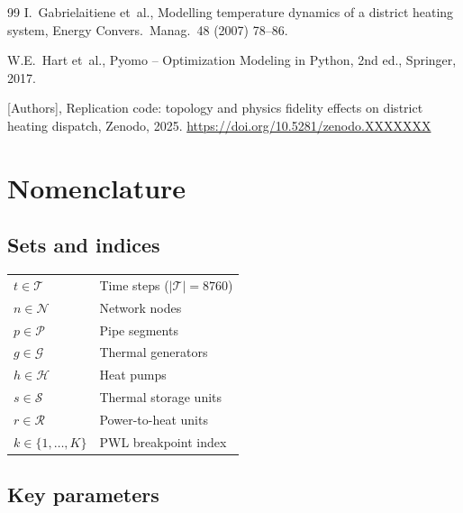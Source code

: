 \documentclass[review,3p]{elsarticle}
\begin{document}
\begin{thebibliography}{99}
I.~Gabrielaitiene et~al.,
Modelling temperature dynamics of a district heating system,
Energy Convers.\ Manag.\ 48 (2007) 78--86.

W.E.~Hart et~al.,
Pyomo -- Optimization Modeling in Python, 2nd ed., Springer, 2017.

[Authors], Replication code: topology and physics fidelity effects on
district heating dispatch, Zenodo, 2025.
\url{https://doi.org/10.5281/zenodo.XXXXXXX}

\end{thebibliography}

\appendix

\section{Nomenclature}
\label{app:nomenclature}

\subsection*{Sets and indices}

\begin{tabular}{@{} >{\raggedright}p{2.8cm} p{9.0cm} @{}}
$t \in \mathcal{T}$           & Time steps ($|\mathcal{T}|=8760$) \\
$n \in \mathcal{N}$           & Network nodes \\
$p \in \mathcal{P}$           & Pipe segments \\
$g \in \mathcal{G}$           & Thermal generators \\
$h \in \mathcal{H}$           & Heat pumps \\
$s \in \mathcal{S}$           & Thermal storage units \\
$r \in \mathcal{R}$           & Power-to-heat units \\
$k \in \{1,\ldots,K\}$       & PWL breakpoint index \\
\end{tabular}

\subsection*{Key parameters}
\end{document}
